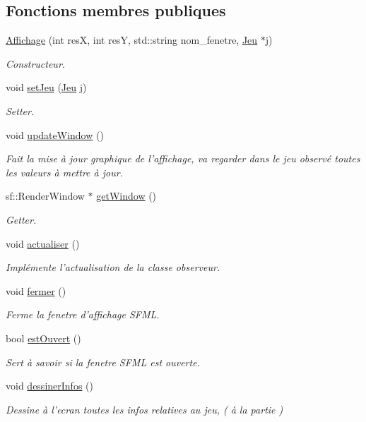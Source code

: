 \subsection*{Fonctions membres publiques}
\begin{DoxyCompactItemize}
\item 
\hyperlink{class_affichage_a7445260b13fa54a65411e810b13ab299}{Affichage} (int res\-X, int res\-Y, std\-::string nom\-\_\-fenetre, \hyperlink{class_jeu}{Jeu} $\ast$j)
\begin{DoxyCompactList}\small\item\em Constructeur. \end{DoxyCompactList}\item 
void \hyperlink{class_affichage_a8ef1dd725b16a7515d0469d9389758ac}{set\-Jeu} (\hyperlink{class_jeu}{Jeu} j)
\begin{DoxyCompactList}\small\item\em Setter. \end{DoxyCompactList}\item 
void \hyperlink{class_affichage_ab8a5da8d3c5a712eceb7c60fc097f076}{update\-Window} ()
\begin{DoxyCompactList}\small\item\em Fait la mise à jour graphique de l'affichage, va regarder dans le jeu observé toutes les valeurs à mettre à jour. \end{DoxyCompactList}\item 
sf\-::\-Render\-Window $\ast$ \hyperlink{class_affichage_a4f102614c071b8dc90a00f136a12d9fd}{get\-Window} ()
\begin{DoxyCompactList}\small\item\em Getter. \end{DoxyCompactList}\item 
void \hyperlink{class_affichage_a76b52d63ae50d54a10bdc27370809a06}{actualiser} ()
\begin{DoxyCompactList}\small\item\em Implémente l'actualisation de la classe observeur. \end{DoxyCompactList}\item 
void \hyperlink{class_affichage_ae9cc540e03d44f364b9266e3ec35e2d1}{fermer} ()
\begin{DoxyCompactList}\small\item\em Ferme la fenetre d'affichage S\-F\-M\-L. \end{DoxyCompactList}\item 
bool \hyperlink{class_affichage_a135fddd2df0e1f2981975cc4ca105265}{est\-Ouvert} ()
\begin{DoxyCompactList}\small\item\em Sert à savoir si la fenetre S\-F\-M\-L est ouverte. \end{DoxyCompactList}\item 
void \hyperlink{class_affichage_afb6dbfbdff30d33ec2cc77393b900e6d}{dessiner\-Infos} ()
\begin{DoxyCompactList}\small\item\em Dessine à l'ecran toutes les infos relatives au jeu, ( à la partie ) \end{DoxyCompactList}\end{DoxyCompactItemize}


